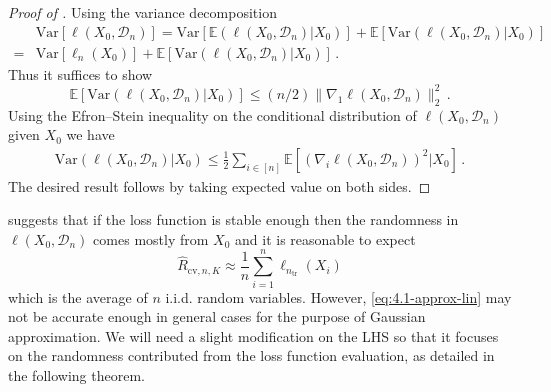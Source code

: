 \documentclass[11pt]{article}
\theoremstyle{plain}
\newcommand{\cv}{{\mathrm{cv}}}
\newcommand{\tr}{{\mathrm{tr}}}
\newcommand{\D}{{\mathcal{D}}}
\newcommand{\var}{\mathrm{Var}}
\begin{document}
\begin{proof}
    [Proof of ]
    Using the variance decomposition
    \begin{align*}
    &\var[\ell(X_0,\D_n)]=\var\left[\mathbb E(\ell(X_0,\D_n)|X_0)\right]+\mathbb E\left[\var(\ell(X_0,\D_n)|X_0)\right]\\
    =&\var\left[\ell_n(X_0)\right]+\mathbb E\left[\var(\ell(X_0,\D_n)|X_0)\right]\,.
    \end{align*}
    Thus it suffices to show 
    $$\mathbb E\left[\var(\ell(X_0,\D_n)|X_0)\right]\le (n/2)\|\nabla_1\ell(X_0,\D_n)\|_2^2\,.$$
    Using the Efron--Stein inequality on the conditional distribution of $\ell(X_0,\D_n)$ given $X_0$ we have
    \begin{align*}
        \var(\ell(X_0,\D_n)|X_0)\le \frac{1}{2}\sum_{i\in [n]} \mathbb E\left[(\nabla_i\ell(X_0,\D_n))^2|X_0\right]\,.
    \end{align*} 
    The desired result follows by taking expected value on both sides.
\end{proof}

 suggests that if the loss function is stable enough then the randomness in $\ell(X_0,\D_n)$ comes mostly from $X_0$ and it is reasonable to expect
\begin{equation}\label{eq:4.1-approx-lin}
\hat R_{\cv,n,K}\approx \frac{1}{n}\sum_{i=1}^n \ell_{n_\tr}(X_i)
\end{equation}
which is the average of $n$ i.i.d. random variables.  However, \eqref{eq:4.1-approx-lin} may not be accurate enough in general cases for the purpose of Gaussian approximation. We will need a slight modification on the LHS so that it focuses on the randomness contributed from the loss function evaluation, as detailed in the following theorem.
\end{document}
